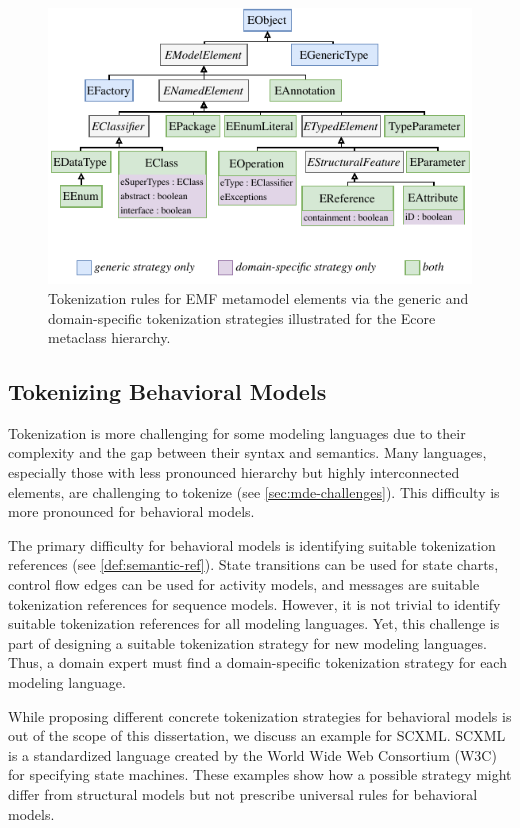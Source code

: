\begin{figure}
    \centering
    \includegraphics[width=0.85\linewidth]{figures/mde/Ecore-Both.pdf}
    \caption[EMF Metamodel Tokenization Strategies]{Tokenization rules for \ac{EMF} metamodel elements via the generic and domain-specific tokenization strategies illustrated for the Ecore metaclass hierarchy.}
    \label{fig:ecore-tokenization}
\end{figure}


\subsection{Tokenizing Behavioral Models}
Tokenization is more challenging for some modeling languages due to their complexity and the gap between their syntax and semantics. Many languages, especially those with less pronounced hierarchy but highly interconnected elements, are challenging to tokenize (see \autoref{sec:mde-challenges}). This difficulty is more pronounced for behavioral models.

The primary difficulty for behavioral models is identifying suitable tokenization references (see \autoref{def:semantic-ref}).
State transitions can be used for state charts, control flow edges can be used for activity models, and messages are suitable tokenization references for sequence models. However, it is not trivial to identify suitable tokenization references for all modeling languages. Yet, this challenge is part of designing a suitable tokenization strategy for new modeling languages. Thus, a domain expert must find a domain-specific tokenization strategy for each modeling language.

While proposing different concrete tokenization strategies for behavioral models is out of the scope of this dissertation, we discuss an example for \ac{SCXML}. \ac{SCXML} is a standardized language created by the World Wide Web Consortium (W3C) for specifying state machines. These examples show how a possible strategy might differ from structural models but not prescribe universal rules for behavioral models.

